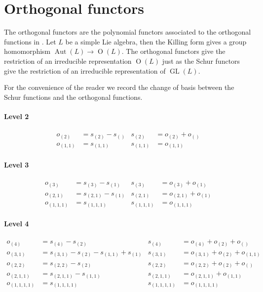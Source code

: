 \documentclass[12pt]{amsart}
\providecommand{\GL}{\operatorname{GL}}
\providecommand{\oO}{\operatorname{O}}
\providecommand{\Aut}{\operatorname{Aut}}
\begin{document}







\section{Orthogonal functors}
The orthogonal functors are the polynomial functors associated to the orthogonal
functions in \cite{Koike1987}. Let $L$ be a simple Lie algebra, then the Killing form
gives a group homomorphism $\Aut(L) \to \oO(L)$. The orthogonal functors give the 
restriction of an irreducible representation $\oO(L)$ just as the Schur functors 
give the restriction of an irreducible representation of $\GL(L)$.

For the convenience of the reader we record the change of basis between the Schur functions and the orthogonal functions.
\paragraph{Level 2}
\begin{align*}
	o_{(2)} &= s_{(2)} - s_{()} & s_{(2)} &= o_{(2)} + o_{()} \\
	o_{(1,1)} &= s_{(1,1)} & s_{(1,1)} &= o_{(1,1)} 
\end{align*}
\paragraph{Level 3}
\begin{align*}
	o_{(3)} &= s_{(3)} - s_{(1)} & s_{(3)} &= o_{(3)} + o_{(1)} \\
	o_{(2,1)} &= s_{(2,1)} - s_{(1)} & s_{(2,1)} &= o_{(2,1)} + o_{(1)} \\
	o_{(1,1,1)} &= s_{(1,1,1)} & s_{(1,1,1)} &= o_{(1,1,1)}
\end{align*}
\paragraph{Level 4}
\begin{align*}
	o_{(4)} &= s_{(4)} - s_{(2)}  & s_{(4)} &= o_{(4)}  + o_{(2)}  + o_{()} \\
	o_{(3,1)} &= s_{(3,1)} - s_{(2)} - s_{(1,1)} + s_{(1)} 
	& s_{(3,1)} &= o_{(3,1)}  + o_{(2)} + o_{(1,1)} \\
	o_{(2,2)} &= s_{(2,2)} - s_{(2)} & s_{(2,2)} &= o_{(2,2)}  + o_{(2)}  + o_{()} \\
	o_{(2,1,1)} &= s_{(2,1,1)} - s_{(1,1)}  & s_{(2,1,1)} &= o_{(2,1,1)} + o_{(1,1)} \\
	o_{(1,1,1,1)} &= s_{(1,1,1,1)} & s_{(1,1,1,1)} &= o_{(1,1,1,1)}
\end{align*}
\end{document}
